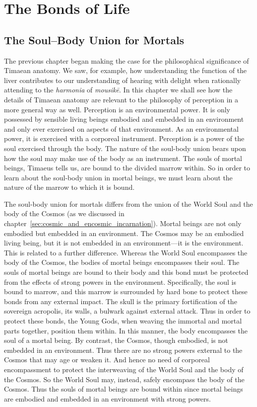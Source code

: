 
\chapter{The Bonds of Life} %
\label{cha:the_bonds_of_life}

\section{The Soul--Body Union for Mortals} %
\label{sec:the_soul_body_union_in_mortals}

The previous chapter began making the case for the philosophical significance of Timae\-an anatomy. We saw, for example, how understanding the function of the liver contributes to our understanding of hearing with delight when rationally attending to the \emph{harmonia} of \emph{mousikē}. In this chapter we shall see how the details of Timaean anatomy are relevant to the philosophy of perception in a more general way as well. Perception is an environmental power. It is only possessed by sensible living beings embodied and embedded in an environment and only ever exercised on aspects of that environment. As an environmental power, it is exercised with a corporeal instrument. Perception is a power of the soul exercised through the body. The nature of the soul-body union bears upon how the soul may make use of the body as an instrument. The souls of mortal beings, Timaeus tells us, are bound to the divided marrow within. So in order to learn about the soul-body union in mortal beings, we must learn about the nature of the marrow to which it is bound.

The soul-body union for mortals differs from the union of the World Soul and the body of the Cosmos (as we discussed in chapter~\ref{sec:cosmic_and_encosmic_incarnation}). Mortal beings are not only embodied but embedded in an environment. The Cosmos may be an embodied living being, but it is not embedded in an environment---it is the environment. This is related to a further difference. Whereas the World Soul encompasses the body of the Cosmos, the bodies of mortal beings encompasses their soul. The souls of mortal beings are bound to their body and this bond must be protected from the effects of strong powers in the environment. Specifically, the soul is bound to marrow, and this marrow is surrounded by hard bone to protect these bonds from any external impact. The skull is the primary fortification of the sovereign acropolis, its walls, a bulwark against external attack. Thus in order to protect these bonds, the Young Gods, when weaving the immortal and mortal parts together, position them within. In this manner, the body encompasses the soul of a mortal being. By contrast, the Cosmos, though embodied, is not embedded in an environment. Thus there are no strong powers external to the Cosmos that may age or weaken it. And hence no need of corporeal encompassment to protect the interweaving of the World Soul and the body of the Cosmos. So the World Soul may, instead, safely encompass the body of the Cosmos. Thus the souls of mortal beings are bound within since mortal beings are embodied and embedded in an environment with strong powers.


